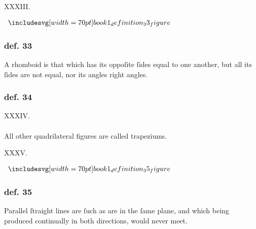 \hfill

\begin{center}
    XXXIII.\label{book1def33}\\
\end{center}
\begin{minipage}{0.33\textwidth}
    \begin{center}
        $\img[0][0][70]{book1_definition_33_figure}$
    \end{center}
\end{minipage}%
\begin{minipage}{0.67\textwidth}
    \subsubsection{def. 33}
    \begin{center}
        \raggedright A rhomboid is that which has its oppoſite ſides equal to one another, but all its ſides are not equal, nor its angles right angles.
    \end{center}
\end{minipage}

\hfill

\begin{minipage}{0.165\textwidth}
    \phantom{}
\end{minipage}%
\begin{minipage}{0.67\textwidth}
    \subsubsection{def. 34}
    \begin{center}
        XXXIV.\label{book1def34}\\
        \hfill\\
        All other quadrilateral figures are called trapeziums.\\
    \end{center}
\end{minipage}%
\begin{minipage}{0.165\textwidth}
    \phantom{}
\end{minipage}%

\hfill

\begin{center}
    XXXV.\label{book1def35}\\
\end{center}
\begin{minipage}{0.33\textwidth}
    \begin{center}
        $\img[0][0][70]{book1_definition_35_figure}$
    \end{center}
\end{minipage}%
\begin{minipage}{0.67\textwidth}
    \subsubsection{def. 35}
    \begin{center}
        \raggedright Parallel ſtraight lines are ſuch as are in the ſame plane, and which being produced continually in both directions, would never meet.
    \end{center}
\end{minipage}

